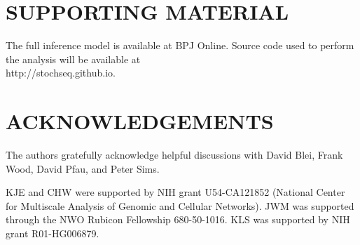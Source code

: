 \documentclass{biophys_letter}
\begin{document}
\section*{SUPPORTING MATERIAL}

The full inference model is available at BPJ Online. Source code used to perform the analysis will be available at \\http://stochseq.github.io.

\section*{ACKNOWLEDGEMENTS}

The authors gratefully acknowledge helpful discussions with David Blei, Frank Wood, David Pfau, and Peter Sims.

KJE and CHW were supported by NIH grant U54-CA121852 (National Center for Multiscale Analysis of Genomic and Cellular Networks). JWM was supported through the NWO Rubicon Fellowship 680-50-1016. KLS was supported by NIH grant R01-HG006879.
\end{document}
